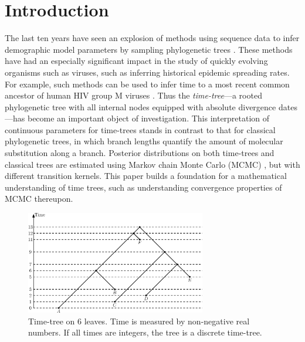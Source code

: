 \documentclass[11pt]{amsart}
\theoremstyle{definition}
\begin{document}
\maketitle

\thispagestyle{empty}
\addtocounter{page}{-1}
\newpage


\section{Introduction}
The last ten years have seen an explosion of methods using sequence data to infer demographic model parameters by sampling phylogenetic trees \autocite{Kuhner1995-mj,Kuhner1998-tq,Kuhner2000-af,Beerli2001-sc,Kuhner2006-vx,Drummond2002,Drummond2005-ks,Drummond2006-oa,Minin2008-wz}.
These methods have had an especially significant impact in the study of quickly evolving organisms such as viruses, such as inferring historical epidemic spreading rates.
For example, such methods can be used to infer time to a most recent common ancestor of human HIV group M viruses \autocite{Worobey2008-rt,Baele2013-op}.
Thus the \emph{time-tree}---a rooted phylogenetic tree with all internal nodes equipped with absolute divergence dates---has become an important object of investigation.
This interpretation of continuous parameters for time-trees stands in contrast to that for classical phylogenetic trees, in which branch lengths quantify the amount of molecular substitution along a branch.
Posterior distributions on both time-trees and classical trees are estimated using Markov chain Monte Carlo (MCMC) \autocite{Mau1997-sq,Yang1997-gv,Drummond2002}, but with different transition kernels.
This paper builds a foundation for a mathematical understanding of time trees, such as understanding convergence properties of MCMC thereupon.

\begin{figure}[ht]
\centering
\includegraphics[width=0.7\textwidth]{timeTree.eps}
\caption{Time-tree on $6$ leaves.
Time is measured by non-negative real numbers.
If all times are integers, the tree is a discrete time-tree.}
\label{timeTree.eps}
\end{figure}
\end{document}
